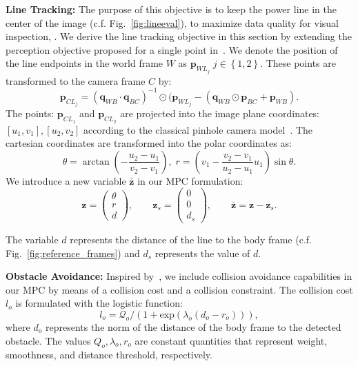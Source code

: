 \medskip
\textbf{Line Tracking: }
The purpose of this objective is to keep the power line in the center of the image (c.f. Fig.~\ref{fig:lineeval}), to maximize data quality for visual inspection, . We derive the line tracking objective in this section by extending the perception objective proposed for a single point in~\cite{Falanga18iros}. We denote the position of the line endpoints in the world frame $W$ as $\bm{p}_{W{L_j}} \; j\in\left\{1, 2\right\}$. These points are transformed to the camera frame $C$ by:
\begin{equation}
	\bm{p}_{C{L_j}} = (\bm{q}_{WB} \cdot \bm{q}_{BC})^{-1} \odot (\bm{p}_{W{L_j}} - (\bm{q}_{WB} \odot \bm{p}_{BC} + \bm{p}_{WB}).
	\label{eq:line_endpoints_camera_frame}	
\end{equation}
The points: $\bm{p}_{C{L_1}}$ and $\bm{p}_{C{L_2}}$ are projected into the image plane coordinates: $[u_1, v_1], [u_2, v_2]$ according to the classical pinhole camera model~\cite{Szeliski10book}. The cartesian coordinates are transformed into the polar coordinates as:
\begin{equation}\label{eq:cartesian_to_polar}
		\theta = \arctan\left(-\frac{u_2 - u_1}{v_2 - {v_1}}\right), \;
		r = \left(v_1 - \frac{v_2 - v_1}{u_2 - u_1} u_1 \right) \sin\theta.
\end{equation}
We introduce a new variable $\bar{\bm{z}}$ in our MPC formulation:
\begin{equation}\label{eq:line_tracking_error}
	\bm{z} = \left(\begin{array}{c}
		\theta \\
		r \\
		d
	\end{array} \right), \qquad
	\bm{z}_s = \left(\begin{array}{c}
		0 \\
		0 \\
		d_s
	\end{array} \right), \qquad
	\overline{\bm{z}} = \bm{z} - \bm{z}_s.
\end{equation}

The variable $d$ represents the distance of the line to the body frame (c.f. Fig.~\ref{fig:reference_frames}) and $d_s$ represents the  value of $d$. 


\textbf{Obstacle Avoidance:}
Inspired by~\cite{zhu2019chance,lin2020robust}, we include collision avoidance capabilities in our MPC by means of a collision cost and a collision constraint. The collision cost $l_{o}$ is formulated with the logistic function:
\begin{equation}\label{eq:collision_cost}
	l_{o} = \mathcal{Q}_o/(1 + \text{exp}\!\left(\lambda_o\left(d_{o} - r_o\right)\right)),
\end{equation}
where $d_{o}$ represents the norm of the distance of the body frame to the detected obstacle.
The values ${Q}_o, \lambda_o, r_o$ are constant quantities that represent weight, smoothness, and distance threshold, respectively.

